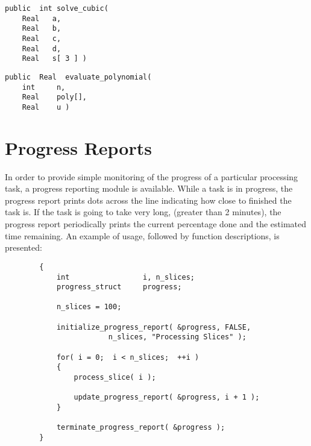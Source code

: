 
{\bf\begin{verbatim}
public  int solve_cubic(
    Real   a,
    Real   b,
    Real   c,
    Real   d,
    Real   s[ 3 ] )
\end{verbatim}}


{\bf\begin{verbatim}
public  Real  evaluate_polynomial(
    int     n,
    Real    poly[],
    Real    u )
\end{verbatim}}


\section{Progress Reports}

In order to provide simple monitoring of the progress of a particular
processing task, a progress reporting module is available.  While a
task is in progress, the progress report prints dots across the line
indicating how close to finished the task is.  If the task is going to
take very long, (greater than 2 minutes), the progress report
periodically prints the current percentage done and the estimated time
remaining.  An example of usage, followed by function descriptions, is
presented:

\begin{verbatim}
        {
            int                 i, n_slices;
            progress_struct     progress;

            n_slices = 100;

            initialize_progress_report( &progress, FALSE,
                        n_slices, "Processing Slices" );

            for( i = 0;  i < n_slices;  ++i )
            {
                process_slice( i );

                update_progress_report( &progress, i + 1 );
            }

            terminate_progress_report( &progress );
        }
\end{verbatim}

